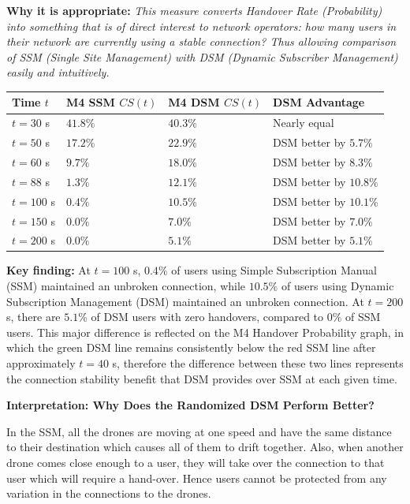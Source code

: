 \documentclass[11pt]{article}
\newcommand{\subquestion}[1]{
    \vspace{0.3cm}
    \noindent\textbf{#1}
    \vspace{0.1cm}
}
\newcommand{\highlight}[1]{\textit{#1}}
\begin{document}
\begin{enumerate}[label=\textbf{Scribe Question \arabic*:}, leftmargin=*, itemsep=1.5em]
\textbf{Why it is appropriate:} \highlight{This measure converts Handover Rate (Probability) into
something that is of direct interest to network operators: how many users in their network are
currently using a stable connection? Thus allowing comparison of SSM (Single Site Management)
with DSM (Dynamic Subscriber Management) easily and intuitively.}

\vspace{0.3cm}
\begin{center}
\begin{tabular}{llll}
    \toprule
    \textbf{Time $t$} & \textbf{M4 SSM $CS(t)$} & \textbf{M4 DSM $CS(t)$} & \textbf{DSM Advantage} \\
    \midrule
    $t = 30$ s  & $41.8\%$ & $40.3\%$ & Nearly equal \\
    $t = 50$ s  & $17.2\%$ & $22.9\%$ & DSM better by $5.7\%$ \\
    $t = 60$ s  & $9.7\%$  & $18.0\%$ & DSM better by $8.3\%$ \\
    $t = 88$ s  & $1.3\%$  & $12.1\%$ & DSM better by $10.8\%$ \\
    $t = 100$ s & $0.4\%$  & $10.5\%$ & DSM better by $10.1\%$ \\
    $t = 150$ s & $0.0\%$  & $7.0\%$  & DSM better by $7.0\%$ \\
    $t = 200$ s & $0.0\%$  & $5.1\%$  & DSM better by $5.1\%$ \\
    \bottomrule
\end{tabular}
\end{center}
\vspace{0.3cm}

\textbf{Key finding:} At $t=100$ s, $0.4\%$ of users using Simple Subscription Manual (SSM)
maintained an unbroken connection, while $10.5\%$ of users using Dynamic Subscription Management
(DSM) maintained an unbroken connection. At $t=200$ s, there are $5.1\%$ of DSM users with zero
handovers, compared to $0\%$ of SSM users. This major difference is reflected on the M4 Handover
Probability graph, in which the green DSM line remains consistently below the red SSM line after
approximately $t=40$ s, therefore the difference between these two lines represents the connection
stability benefit that DSM provides over SSM at each given time.

\subquestion{Interpretation: Why Does the Randomized DSM Perform Better?}

In the SSM, all the drones are moving at one speed and have the same distance to their destination
which causes all of them to drift together. Also, when another drone comes close enough to a user,
they will take over the connection to that user which will require a hand-over. Hence users cannot be
protected from any variation in the connections to the drones.


\end{enumerate}
\end{document}
